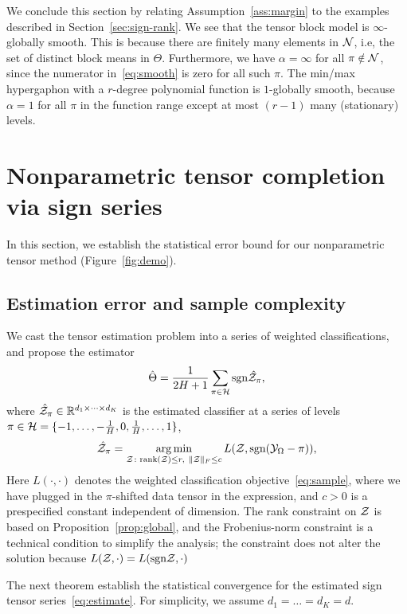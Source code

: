 \documentclass{article}
\theoremstyle{plain}
\theoremstyle{definition}
\def\sign{\textup{sgn}}
\begin{document}
We conclude this section by relating Assumption~\ref{ass:margin} to the examples described in Section~\ref{sec:sign-rank}. 
We see that the tensor block model is $\infty$-globally smooth. This is because there are finitely many elements in $\mathcal{N}$, i.e, the set of distinct block means in $\Theta$. Furthermore, we have $\alpha= \infty$ for all $\pi \notin \mathcal{N}$, since the numerator in~\eqref{eq:smooth} is zero for all such $\pi$. The min/max hypergaphon with a $r$-degree polynomial function is $1$-globally smooth, because $\alpha=1$ for all $\pi$ in the function range except at most $(r-1)$ many (stationary) levels. 




\section{Nonparametric tensor completion via sign series}\label{sec:estimation}
In this section, we establish the statistical error bound for our nonparametric tensor method (Figure~\ref{fig:demo}). 

\subsection{Estimation error and sample complexity}
We cast the tensor estimation problem into a series of weighted classifications, and propose the estimator
\begin{equation}\label{eq:est}
\hat \Theta = {1\over 2H+1}\sum_{\pi \in \tH}\sign{\hat \tZ_\pi},
\end{equation}
where $\hat {\mathcal{Z}}_\pi\in\mathbb{R}^{d_1\times \dots\times d_K}$ is the estimated classifier at a series of levels $\pi \in \mathcal{H}=\{-1,\ldots,-{1\over H}, 0, {1\over H},\ldots,1\}$,
\begin{equation}\label{eq:estimate}
\hat \tZ_\pi = \argmin_{\tZ\colon \text{rank}(\tZ)\leq r, \ \FnormSize{}{\tZ}\leq c} L(\tZ, \sign(\tY_\Omega-\pi)),
\end{equation}
Here $L(\cdot,\cdot)$ denotes the weighted classification objective~\eqref{eq:sample}, where we have plugged in the $\pi$-shifted data tensor in the expression, and $c>0$ is a prespecified constant independent of dimension. The rank constraint on $\mathcal{Z}$ is based on Proposition~\ref{prop:global}, and the Frobenius-norm constraint is a technical condition to simplify the analysis; the constraint does not alter the solution because $L(\tZ,\cdot)=L(\sign \tZ,\cdot)$ 

The next theorem establish the statistical convergence for the estimated sign tensor series~\eqref{eq:estimate}. For simplicity, we assume $d_1=\ldots=d_K=d$.
\end{document}
